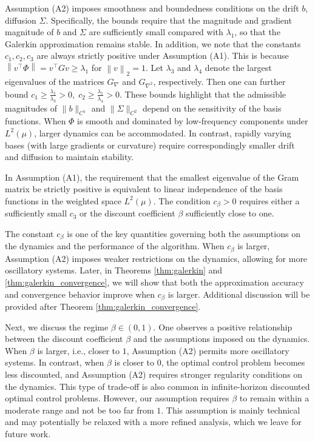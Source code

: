\documentclass[12pt]{article}
\def\lam{\lambda}
\def\ll{\left\lVert}
\def\rl{\right\rVert}
\begin{document}
\iffalse
Assumption (A2) imposes smoothness and boundedness conditions on the drift $b$, diffusion $\Sigma$. Specifically, the bounds require that the magnitude and gradient magnitude of $b$ and $\Sigma$ are sufficiently small compared with $\lam_1$, so that the Galerkin approximation remains stable. In addition, we note that the constants $c_1, c_2, c_3$ are always strictly positive under Assumption (A1). This is because $\ll v^\top \Phi \rl = v^\top G v \geq \lam_1$ for $\ll v \rl_2 = 1$. Let $\lambda_3$ and $\lambda_4$ denote the largest eigenvalues of the matrices $G_{\nabla}$ and $G_{\nabla^2}$, respectively. Then one can further bound $c_1 \geq \frac{\lambda_1}{\lambda_3}>0, \; c_2 \geq \frac{\lambda_1}{\lambda_4}>0$. These bounds highlight that the admissible magnitudes of $\|b\|_{C^1}$ and $\|\Sigma\|_{C^2}$ depend on the sensitivity of the basis functions. When $\Phi$ is smooth and dominated by low-frequency components under $L^2(\mu)$, larger dynamics can be accommodated. In contrast, rapidly varying bases (with large gradients or curvature) require correspondingly smaller drift and diffusion to maintain stability.









In Assumption (A1), the requirement that the smallest eigenvalue of the Gram matrix be strictly positive is equivalent to linear independence of the basis functions in the weighted space $L^2(\mu)$. The condition $c_\beta>0$ requires either a sufficiently small $c_3$ or the discount coefficient $\beta$ sufficiently close to one.




The constant $c_\beta$ is one of the key quantities governing both the assumptions on the dynamics and the performance of the algorithm. When $c_\beta$ is larger, Assumption (A2) imposes weaker restrictions on the dynamics, allowing for more oscillatory systems. Later, in Theorems \ref{thm:galerkin} and \ref{thm:galerkin_convergence}, we will show that both the approximation accuracy and convergence behavior improve when $c_\beta$ is larger. Additional discussion will be provided after Theorem \ref{thm:galerkin_convergence}. 

Next, we discuss the regime $\beta\in(0,1)$. One observes a positive relationship between the discount coefficient $\beta$ and the assumptions imposed on the dynamics. When $\beta$ is larger, i.e., closer to $1$, Assumption (A2) permits more oscillatory systems. In contrast, when $\beta$ is closer to $0$, the optimal control problem becomes less discounted, and Assumption (A2) requires stronger regularity conditions on the dynamics. This type of trade-off is also common in infinite-horizon discounted optimal control problems. However, our assumption requires $\beta$ to remain within a moderate range and not be too far from $1$. This assumption is mainly technical and may potentially be relaxed with a more refined analysis, which we leave for future work.
\end{document}
